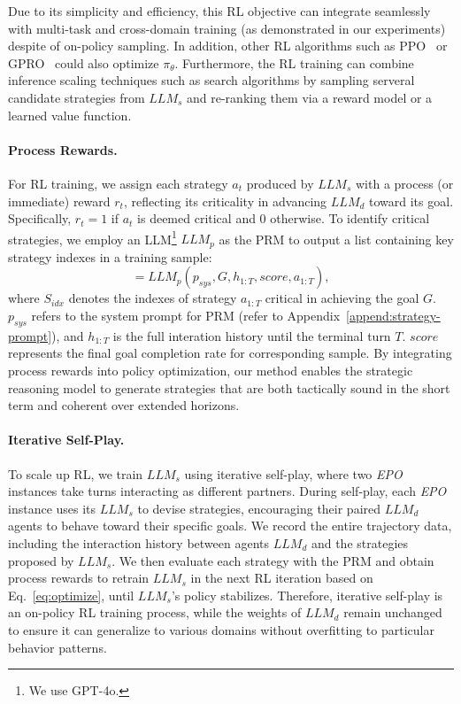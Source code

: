 Due to its simplicity and efficiency, this RL objective can integrate seamlessly with multi-task and cross-domain training (as demonstrated in our experiments) despite of on-policy sampling.
In addition, other RL algorithms such as PPO~\cite{schulman2017proximal} or GPRO~\cite{Shao2024DeepSeekMathPT} could also optimize $\pi_\theta$. 
Furthermore, the RL training can combine inference scaling techniques such as search algorithms by sampling serveral candidate strategies from $LLM_s$ and re-ranking them via a reward model or a learned value function.



\paragraph{\textbf{Process Rewards.}}  
For RL training, we assign each strategy $a_t$ produced by $LLM_s$ with a process (or immediate) reward $r_t$, reflecting its criticality in advancing $ LLM_d $ toward its goal. 
Specifically, $ r_t = 1 $ if $ a_t $ is deemed critical and 0 otherwise. 
To identify critical strategies, we employ an LLM\footnote{We use GPT-4o.} $LLM_p$ as the PRM to output a list containing key strategy indexes in a training sample:
\begin{equation}
    [S_{idx}] = LLM_p(p_{sys},G,h_{1:T},score,a_{1:T}),
\end{equation}
where $S_{idx}$ denotes the indexes of strategy $a_{1:T}$ critical in achieving the goal $G$. $p_{sys}$ refers to the system prompt for PRM (refer to Appendix~\ref{append:strategy-prompt}), and $h_{1:T}$ is the full interation history until the terminal turn $T$.
$score$ represents the final goal completion rate for corresponding sample.
By integrating process rewards into policy optimization, our method enables the strategic reasoning model to generate strategies that are both tactically sound in the short term and coherent over extended horizons.


\paragraph{\textbf{Iterative Self-Play.}}
To scale up RL, we train $LLM_s$ using iterative self-play, where two \textit{EPO} instances take turns interacting as different partners. During self-play, each \textit{EPO} instance uses its $LLM_s$ to devise strategies, encouraging their paired $LLM_d$ agents to behave toward their specific goals.
We record the entire trajectory data, including the interaction history between agents $LLM_d$ and the strategies proposed by $LLM_s$.
We then evaluate each strategy with the PRM and obtain process rewards to retrain $LLM_s$ in the next RL iteration based on Eq.~\ref{eq:optimize}, until $LLM_s$'s policy stabilizes.
Therefore, iterative self-play is an on-policy RL training process, while the weights of $LLM_d$ remain unchanged to ensure it can generalize to various domains without overfitting to particular behavior patterns.


